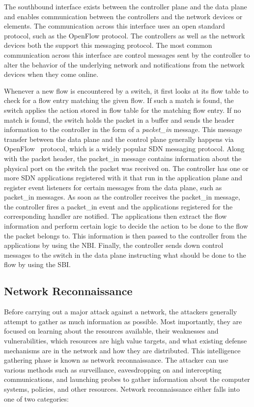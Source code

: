  The southbound interface 
exists between the controller plane and the data plane and enables
communication between the controllers and the network devices or
elements. The communication across this interface uses an open standard
protocol, such as the OpenFlow protocol. The controllers as well as the
network devices both the support this messaging protocol. The most 
common communication across this interface are control messages sent by
the controller to alter the behavior of the underlying network and
notifications from the network devices when they come online. 

Whenever a new flow is encountered by a switch, it first looks at its
flow table to check for a flow entry matching the given flow. If such a 
match is found, the switch applies the action stored in flow table for
the matching flow entry. If no match is found, the switch holds the 
packet in a buffer and sends the header information to the controller 
in the form of a \textit{packet\_in} message. This message transfer 
between the data plane and the control plane generally happens via 
OpenFlow~\cite{specification2015v151} protocol, which is a widely
popular SDN messaging protocol. Along with the packet header, the 
packet\_in message contains information about the physical port on the
switch the packet was received on. The controller has one or more SDN
applications registered with it that run in the application plane and
register event listeners for certain messages from the data plane, such
as packet\_in messages. As soon as the controller receives the 
packet\_in message, the controller fires a packet\_in event and the
applications registered for the corresponding handler are notified. The
applications then extract the flow information and perform certain logic
to decide the action to be done to the flow the packet belongs to. This
information is then passed to the controller from the applications by 
using the NBI. Finally, the controller sends down control messages to 
the switch in the data plane instructing what should be done to the 
flow by using the SBI. 

\subsection{Network Reconnaissance}
Before carrying out a major attack against a network, the attackers
generally attempt to gather as much information as possible. Most
importantly, they are focused on learning about the resources available,
their weaknesses and vulnerabilities, which resources are high value
targets, and what existing defense mechanisms are in the network and how 
they are distributed. This intelligence gathering phase is known as 
network reconnaissance. The attacker can use various methods such as 
surveillance, eavesdropping on and intercepting communications, and 
launching probes to gather information about the computer systems, 
policies, and other resources. Network reconnaissance either falls into
one of two categories:

